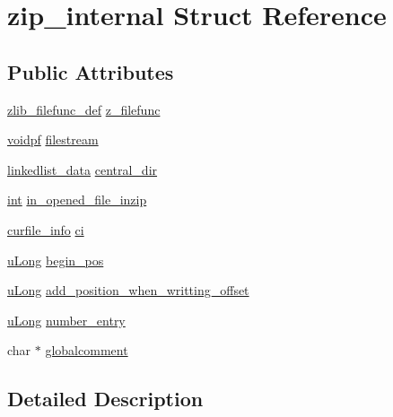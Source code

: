\hypertarget{structzip__internal}{\section{zip\-\_\-internal Struct Reference}
\label{structzip__internal}
}
\subsection*{Public Attributes}
\begin{DoxyCompactItemize}
\item 
\hyperlink{ioapi_8h_a269f2bded66a7ee4052a60025afebd7e}{zlib\-\_\-filefunc\-\_\-def} \hyperlink{structzip__internal_a52b481ed001fdb87cc389c128b8c0f6e}{z\-\_\-filefunc}
\item 
\hyperlink{zconf_8h_aa0944432a046192e6602e13ec126acaa}{voidpf} \hyperlink{structzip__internal_a1444d3938300b2fa4e8f1e2a99475138}{filestream}
\item 
\hyperlink{zip_8c_ab52b5c8e8dd89c66d476a4be0752755b}{linkedlist\-\_\-data} \hyperlink{structzip__internal_ae63acf37b5a3719b3eae7802115ed73c}{central\-\_\-dir}
\item 
\hyperlink{ioapi_8h_a787fa3cf048117ba7123753c1e74fcd6}{int} \hyperlink{structzip__internal_a98dbf3927482a45adefcd32d12bd7840}{in\-\_\-opened\-\_\-file\-\_\-inzip}
\item 
\hyperlink{structcurfile__info}{curfile\-\_\-info} \hyperlink{structzip__internal_ab087c0930e1deeaf9f3dc9199d88c18f}{ci}
\item 
\hyperlink{zconf_8h_a154b3b80120c903a368fec5f11f3007a}{u\-Long} \hyperlink{structzip__internal_a913be8e62247a3fbe1ffcdf7c03d0248}{begin\-\_\-pos}
\item 
\hyperlink{zconf_8h_a154b3b80120c903a368fec5f11f3007a}{u\-Long} \hyperlink{structzip__internal_a6cd048a07f19de1144c9a7edc3645422}{add\-\_\-position\-\_\-when\-\_\-writting\-\_\-offset}
\item 
\hyperlink{zconf_8h_a154b3b80120c903a368fec5f11f3007a}{u\-Long} \hyperlink{structzip__internal_a8415937c4a5b2afc0adde407d59f2750}{number\-\_\-entry}
\item 
char $\ast$ \hyperlink{structzip__internal_a8a49f83da0affc89cfc541ab38e72471}{globalcomment}
\end{DoxyCompactItemize}


\subsection{Detailed Description}


